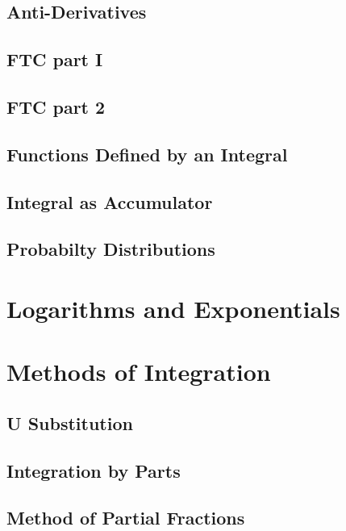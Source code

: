 \documentclass{amsbook}
\begin{document}
\section{Anti-Derivatives}

\section{FTC part I}

\section{FTC part 2}

\section{Functions Defined by an Integral}

\section{Integral as Accumulator}

\section{Probabilty Distributions}


\chapter{Logarithms and Exponentials}


\chapter{Methods of Integration}
\section{U Substitution}

\section{Integration by Parts}

\section{Method of Partial Fractions}
\end{document}
